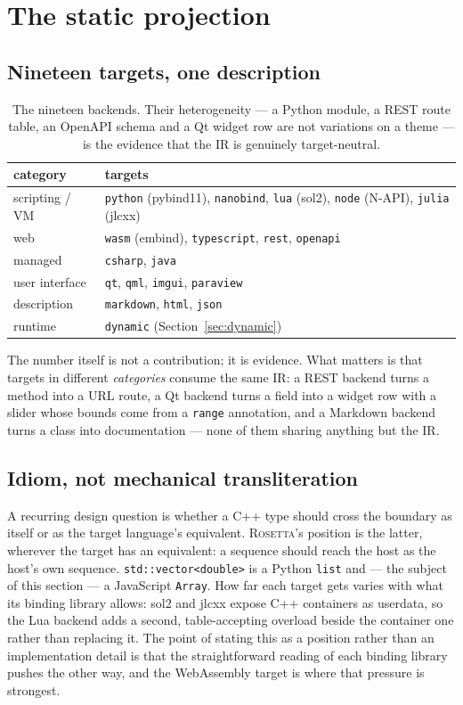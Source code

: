 \documentclass[11pt,a4paper]{article}
\newcommand{\rosetta}{\textsc{Rosetta}}
\newcommand{\code}[1]{\texttt{\small #1}}
\begin{document}
\section{The static projection}
\label{sec:static}

\subsection{Nineteen targets, one description}

\begin{table}[h]
\centering\small
\begin{tabular}{ll}
\toprule
category & targets \\
\midrule
scripting / VM & \code{python} (pybind11), \code{nanobind}, \code{lua} (sol2), \code{node} (N-API), \code{julia} (jlcxx) \\
web & \code{wasm} (embind), \code{typescript}, \code{rest}, \code{openapi} \\
managed & \code{csharp}, \code{java} \\
user interface & \code{qt}, \code{qml}, \code{imgui}, \code{paraview} \\
description & \code{markdown}, \code{html}, \code{json} \\
runtime & \code{dynamic} (Section~\ref{sec:dynamic}) \\
\bottomrule
\end{tabular}
\caption{The nineteen backends. Their heterogeneity --- a Python module, a REST
route table, an OpenAPI schema and a Qt widget row are not variations on a theme
--- is the evidence that the IR is genuinely target-neutral.}
\label{tab:backends}
\end{table}

The number itself is not a contribution; it is evidence. What matters is that
targets in different \emph{categories} consume the same IR: a REST backend turns
a method into a URL route, a Qt backend turns a field into a widget row with a
slider whose bounds come from a \code{range} annotation, and a Markdown backend
turns a class into documentation --- none of them sharing anything but the IR.

\subsection{Idiom, not mechanical transliteration}
\label{sec:idiom}

A recurring design question is whether a C++ type should cross the boundary as
itself or as the target language's equivalent. \rosetta's position is the
latter, wherever the target has an equivalent: a sequence should reach the host
as the host's own sequence. \code{std::vector<double>} is a Python \code{list}
and --- the subject of this section --- a JavaScript \code{Array}. How far each
target gets varies with what its binding library allows: sol2 and jlcxx expose
C++ containers as userdata, so the Lua backend adds a second, table-accepting
overload beside the container one rather than replacing it. The point of stating
this as a position rather than an implementation detail is that the
straightforward reading of each binding library pushes the other way, and the
WebAssembly target is where that pressure is strongest.
\end{document}
